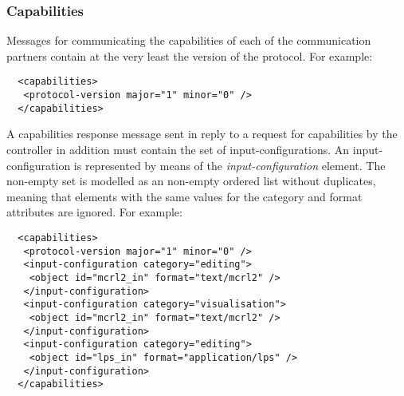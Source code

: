 \documentclass{article}
\begin{document}

   

  \subsubsection{Capabilities}

   Messages for communicating the capabilities of each of the communication
   partners contain at the very least the version of the protocol. For example:

   \small \begin{verbatim}
  <capabilities>
   <protocol-version major="1" minor="0" />
  </capabilities>\end{verbatim}
  \normalsize

   \noindent A capabilities response message sent in reply to a request for
   capabilities by the controller in addition must contain the set of
   input-configurations. An input-configuration is represented by means of the
   \textit{input-configuration} element. The non-empty set is modelled as an
   non-empty ordered list without duplicates, meaning that elements with the
   same values for the category and format attributes are ignored. For example:

   \small \begin{verbatim}
  <capabilities>
   <protocol-version major="1" minor="0" />
   <input-configuration category="editing">
    <object id="mcrl2_in" format="text/mcrl2" />
   </input-configuration>
   <input-configuration category="visualisation">
    <object id="mcrl2_in" format="text/mcrl2" />
   </input-configuration>
   <input-configuration category="editing">
    <object id="lps_in" format="application/lps" />
   </input-configuration>
  </capabilities>\end{verbatim}
  \normalsize
\end{document}

